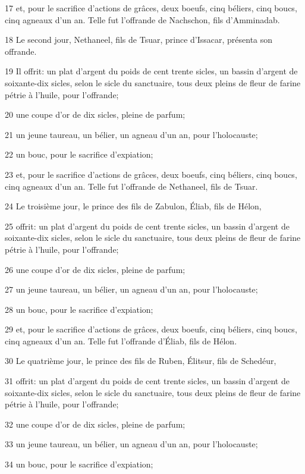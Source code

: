 \par 17 et, pour le sacrifice d'actions de grâces, deux boeufs, cinq béliers, cinq boucs, cinq agneaux d'un an. Telle fut l'offrande de Nachschon, fils d'Amminadab.
\par 18 Le second jour, Nethaneel, fils de Tsuar, prince d'Issacar, présenta son offrande.
\par 19 Il offrit: un plat d'argent du poids de cent trente sicles, un bassin d'argent de soixante-dix sicles, selon le sicle du sanctuaire, tous deux pleins de fleur de farine pétrie à l'huile, pour l'offrande;
\par 20 une coupe d'or de dix sicles, pleine de parfum;
\par 21 un jeune taureau, un bélier, un agneau d'un an, pour l'holocauste;
\par 22 un bouc, pour le sacrifice d'expiation;
\par 23 et, pour le sacrifice d'actions de grâces, deux boeufs, cinq béliers, cinq boucs, cinq agneaux d'un an. Telle fut l'offrande de Nethaneel, fils de Tsuar.
\par 24 Le troisième jour, le prince des fils de Zabulon, Éliab, fils de Hélon,
\par 25 offrit: un plat d'argent du poids de cent trente sicles, un bassin d'argent de soixante-dix sicles, selon le sicle du sanctuaire, tous deux pleins de fleur de farine pétrie à l'huile, pour l'offrande;
\par 26 une coupe d'or de dix sicles, pleine de parfum;
\par 27 un jeune taureau, un bélier, un agneau d'un an, pour l'holocauste;
\par 28 un bouc, pour le sacrifice d'expiation;
\par 29 et, pour le sacrifice d'actions de grâces, deux boeufs, cinq béliers, cinq boucs, cinq agneaux d'un an. Telle fut l'offrande d'Éliab, fils de Hélon.
\par 30 Le quatrième jour, le prince des fils de Ruben, Élitsur, fils de Schedéur,
\par 31 offrit: un plat d'argent du poids de cent trente sicles, un bassin d'argent de soixante-dix sicles, selon le sicle du sanctuaire, tous deux pleins de fleur de farine pétrie à l'huile, pour l'offrande;
\par 32 une coupe d'or de dix sicles, pleine de parfum;
\par 33 un jeune taureau, un bélier, un agneau d'un an, pour l'holocauste;
\par 34 un bouc, pour le sacrifice d'expiation;
